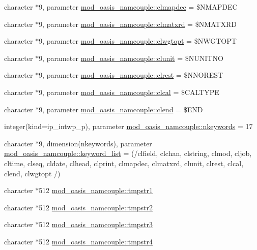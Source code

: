 \begin{DoxyCompactItemize}
\item 
character $\ast$9, parameter \hyperlink{namespacemod__oasis__namcouple_acb6d787969090bd3c10b20775abf6531}{mod\+\_\+oasis\+\_\+namcouple\+::clmapdec} = \textquotesingle{}\$N\+M\+A\+P\+D\+EC \textquotesingle{}
\item 
character $\ast$9, parameter \hyperlink{namespacemod__oasis__namcouple_ab529642a54ad832b85c11fe4bd843314}{mod\+\_\+oasis\+\_\+namcouple\+::clmatxrd} = \textquotesingle{}\$N\+M\+A\+T\+X\+RD \textquotesingle{}
\item 
character $\ast$9, parameter \hyperlink{namespacemod__oasis__namcouple_a5ddab80f5f002c5cee81e3bbcfcda6be}{mod\+\_\+oasis\+\_\+namcouple\+::clwgtopt} = \textquotesingle{}\$N\+W\+G\+T\+O\+PT \textquotesingle{}
\item 
character $\ast$9, parameter \hyperlink{namespacemod__oasis__namcouple_a003e41234b67967593d94b3dca1a69c3}{mod\+\_\+oasis\+\_\+namcouple\+::clunit} = \textquotesingle{}\$N\+U\+N\+I\+T\+NO \textquotesingle{}
\item 
character $\ast$9, parameter \hyperlink{namespacemod__oasis__namcouple_a283471addd7aefe719c8eb6bc45072b0}{mod\+\_\+oasis\+\_\+namcouple\+::clrest} = \textquotesingle{}\$N\+N\+O\+R\+E\+ST \textquotesingle{}
\item 
character $\ast$9, parameter \hyperlink{namespacemod__oasis__namcouple_ad027273d67834ba44518cd9825f933b8}{mod\+\_\+oasis\+\_\+namcouple\+::clcal} = \textquotesingle{}\$C\+A\+L\+T\+Y\+PE \textquotesingle{}
\item 
character $\ast$9, parameter \hyperlink{namespacemod__oasis__namcouple_a52b0d4b9289219603308d3cb3fcc9eac}{mod\+\_\+oasis\+\_\+namcouple\+::clend} = \textquotesingle{}\$E\+ND \textquotesingle{}
\item 
integer(kind=ip\+\_\+intwp\+\_\+p), parameter \hyperlink{namespacemod__oasis__namcouple_ab629bd69885e9cd058f694b00474333a}{mod\+\_\+oasis\+\_\+namcouple\+::nkeywords} = 17
\item 
character $\ast$9, dimension(nkeywords), parameter \hyperlink{namespacemod__oasis__namcouple_acd9594862404b2bbd26a2ce069076b0e}{mod\+\_\+oasis\+\_\+namcouple\+::keyword\+\_\+list} = (/clfield, clchan, clstring, clmod, cljob, cltime, clseq, cldate, clhead, clprint, clmapdec, clmatxrd, clunit, clrest, clcal, clend, clwgtopt /)
\item 
character $\ast$512 \hyperlink{namespacemod__oasis__namcouple_aca533555969c4dff9419daac8c70bbda}{mod\+\_\+oasis\+\_\+namcouple\+::tmpstr1}
\item 
character $\ast$512 \hyperlink{namespacemod__oasis__namcouple_a675d6fc398ff3a060fbd9949fde4d0e2}{mod\+\_\+oasis\+\_\+namcouple\+::tmpstr2}
\item 
character $\ast$512 \hyperlink{namespacemod__oasis__namcouple_a5564b823ced851e25d198f2c300dc138}{mod\+\_\+oasis\+\_\+namcouple\+::tmpstr3}
\item 
character $\ast$512 \hyperlink{namespacemod__oasis__namcouple_ada1acbaf7e666b7220e3b7fb8d0f2549}{mod\+\_\+oasis\+\_\+namcouple\+::tmpstr4}
\end{DoxyCompactItemize}
